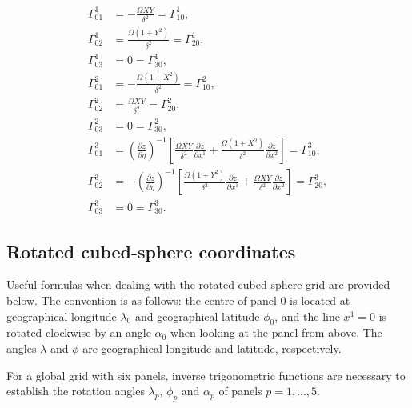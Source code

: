 \documentclass{article}
\begin{document}
\begin{align}
\Gamma^1_{01}&=-\frac{\Omega XY}{\delta^2}=\Gamma^1_{10}, \\
\Gamma^1_{02}&=\frac{\Omega (1+Y^2)}{\delta^2}=\Gamma^1_{20}, \\
\Gamma^1_{03}&=0=\Gamma^1_{30}, \\
\Gamma^2_{01}&=-\frac{\Omega (1+X^2)}{\delta^2}=\Gamma^2_{10}, \\
\Gamma^2_{02}&=\frac{\Omega XY}{\delta^2}=\Gamma^2_{20}, \\
\Gamma^2_{03}&=0=\Gamma^2_{30}, \\
\Gamma^3_{01}&=\left(\frac{\partial z}{\partial \eta}\right)^{-1}\left[ \frac{\Omega XY}{\delta^2} \frac{\partial z}{\partial x^1}+ \frac{\Omega (1+X^2)}{\delta^2} \frac{\partial z}{\partial x^2}  \right]=\Gamma^3_{10}, \\
\Gamma^3_{02}&=-\left(\frac{\partial z}{\partial \eta}\right)^{-1}\left[ \frac{\Omega (1+Y^2)}{\delta^2} \frac{\partial z}{\partial x^1}+\frac{\Omega XY}{\delta^2}\frac{\partial z}{\partial x^2}  \right]=\Gamma^3_{20}, \\
\Gamma^3_{03}&=0=\Gamma^3_{30}.
\end{align}
\subsection{Rotated cubed-sphere coordinates}
Useful formulas when dealing with the rotated cubed-sphere grid are provided below. The convention is as follows: the centre of panel $0$ is located at geographical longitude $\lambda_0$ and geographical latitude $\phi_0$, and the line $x^1=0$ is rotated clockwise by an angle $\alpha_0$ when looking at the panel from above. The angles $\lambda$ and $\phi$ are geographical longitude and latitude, respectively.

For a global grid with six panels, inverse trigonometric functions are necessary to establish the rotation angles $\lambda_p$, $\phi_p$ and $\alpha_p$ of panels $p=1,...,5$.
\end{document}
